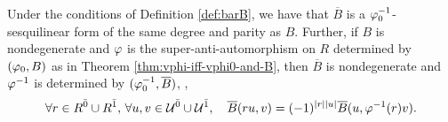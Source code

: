 \documentclass{amsbook}
\begin{document}
\begin{prop}\label{prop:barB-determines-vphi-inv}
    Under the conditions of Definition \ref{def:barB}, we have that $\overline {B}$ is a $\varphi_0^{-1}$-sesquilinear form of the same degree and parity as $B$. 
    Further, if $B$ is nondegenerate and $\varphi$ is the super-anti-automorphism on $R$ determined by $(\varphi_0, B)$ as in Theorem \ref{thm:vphi-iff-vphi0-and-B}, then $\overline{B}$ is nondegenerate and $\varphi^{-1}$ is determined by $(\varphi_0^{-1}, \overline B)$, \ie, 
    \begin{equation}\label{eq:barB-superadjunction}
        \forall r\in R^{\bar0} \cup R^{\bar1} ,\,\forall u, v \in \mathcal U^{\bar0} \cup \mathcal U^{\bar1},  \quad \overline {B}(ru,v) = (-1)^{|r||u|} \overline {B}(u,\varphi^{-1} (r)v).
    \end{equation}
\end{prop}
\end{document}

